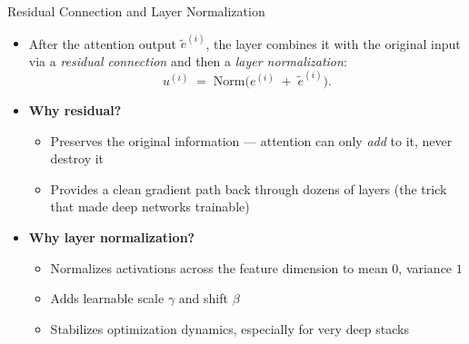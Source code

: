 \documentclass[10pt,english,aspectratio=169]{beamer}
\begin{document}
\begin{frame}{Residual Connection and Layer Normalization}
\begin{itemize}
\item After the attention output $\tilde{e}^{(i)}$, the layer combines it with the original input via a \emph{residual connection} and then a \emph{layer normalization}:
\[
   u^{(i)} \;=\; \mathrm{Norm}\bigl(e^{(i)} \;+\; \tilde{e}^{(i)}\bigr).
\]

\medskip
\item \textbf{Why residual?}
\begin{itemize}
    \item Preserves the original information --- attention can only \emph{add} to it, never destroy it
    \item Provides a clean gradient path back through dozens of layers (the trick that made deep networks trainable)
\end{itemize}

\medskip
\item \textbf{Why layer normalization?}
\begin{itemize}
    \item Normalizes activations across the feature dimension to mean $0$, variance $1$
    \item Adds learnable scale $\gamma$ and shift $\beta$
    \item Stabilizes optimization dynamics, especially for very deep stacks
\end{itemize}
\end{itemize}
\end{frame}
\end{document}
